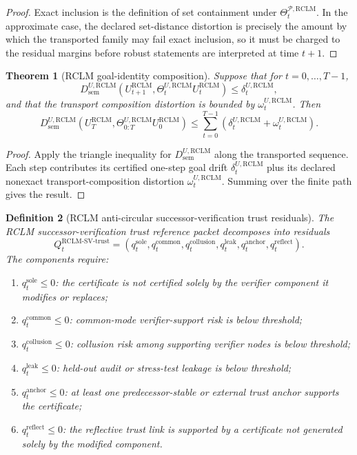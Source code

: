 \documentclass[11pt,a4paper]{article}
\newtheorem{theorem}{Theorem}[section]
\newtheorem{definition}[theorem]{Definition}
\newcommand{\Pcal}{\mathcal P}
\newcommand{\RCLM}{\mathrm{RCLM}}
\newcommand{\sem}{\mathrm{sem}}
\newcommand{\trust}{\mathrm{trust}}
\newcommand{\anchor}{\mathrm{anchor}}
\newcommand{\sole}{\mathrm{sole}}
\begin{document}
\begin{proof}
Exact inclusion is the definition of set containment under \(\Theta_t^{\Pcal,\RCLM}\). In the approximate case, the declared set-distance distortion is precisely the amount by which the transported family may fail exact inclusion, so it must be charged to the residual margins before robust statements are interpreted at time \(t+1\).
\end{proof}

\begin{theorem}[RCLM goal-identity composition]
\label{thm:rclm-batch12a-goal-identity-composition}
Suppose that for \(t=0,\ldots,T-1\),
\[
D_{\sem}^{U,\RCLM}(U_{t+1}^{\RCLM},\Theta_t^{U,\RCLM}U_t^{\RCLM})
\le
\delta_t^{U,\RCLM},
\]
and that the transport composition distortion is bounded by \(\omega_t^{U,\RCLM}\). Then
\[
D_{\sem}^{U,\RCLM}
\left(
U_T^{\RCLM},
\Theta_{0:T}^{U,\RCLM}U_0^{\RCLM}
\right)
\le
\sum_{t=0}^{T-1}(\delta_t^{U,\RCLM}+\omega_t^{U,\RCLM}).
\]
\end{theorem}

\begin{proof}
Apply the triangle inequality for \(D_{\sem}^{U,\RCLM}\) along the transported sequence. Each step contributes its certified one-step goal drift \(\delta_t^{U,\RCLM}\) plus its declared nonexact transport-composition distortion \(\omega_t^{U,\RCLM}\). Summing over the finite path gives the result.
\end{proof}

\begin{definition}[RCLM anti-circular successor-verification trust residuals]
\label{def:rclm-batch12a-trust-residuals}
The RCLM successor-verification trust reference packet decomposes into residuals
\[
Q_t^{\RCLM\text{-}\mathrm{SV}\text{-}\trust}
=
(q_t^{\sole},q_t^{\mathrm{common}},q_t^{\mathrm{collusion}},q_t^{\mathrm{leak}},q_t^{\anchor},q_t^{\mathrm{reflect}}).
\]
The components require:
\begin{enumerate}[label=(\roman*),leftmargin=1.5em]
    \item \(q_t^{\sole}\le0\): the certificate is not certified solely by the verifier component it modifies or replaces;
    \item \(q_t^{\mathrm{common}}\le0\): common-mode verifier-support risk is below threshold;
    \item \(q_t^{\mathrm{collusion}}\le0\): collusion risk among supporting verifier nodes is below threshold;
    \item \(q_t^{\mathrm{leak}}\le0\): held-out audit or stress-test leakage is below threshold;
    \item \(q_t^{\anchor}\le0\): at least one predecessor-stable or external trust anchor supports the certificate;
    \item \(q_t^{\mathrm{reflect}}\le0\): the reflective trust link is supported by a certificate not generated solely by the modified component.
\end{enumerate}
\end{definition}
\end{document}
